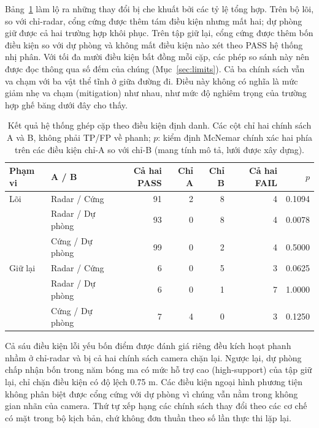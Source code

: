 \documentclass[conference]{IEEEtran}
\begin{document}
Bảng~\ref{tab:paired} làm lộ ra những thay đổi bị che khuất bởi các tỷ lệ tổng
hợp. Trên bộ lõi, so với chỉ-radar, cổng cứng được thêm tám điều kiện nhưng
mất hai; dự phòng giữ được cả hai trường hợp khôi phục. Trên tập giữ lại, cổng
cứng được thêm bốn điều kiện so với dự phòng và không mất điều kiện nào xét
theo PASS hệ thống nhị phân. Với tối đa mười điều kiện bất đồng mỗi cặp, các
phép so sánh này nên được đọc thông qua số đếm của chúng
(Mục~\ref{sec:limits}). Cả ba chính sách
vẫn va chạm với ba vật thể tĩnh ở giữa đường đi. Điều này không có nghĩa là
mức giảm nhẹ va chạm (mitigation) như nhau, như mức độ nghiêm trọng của trường
hợp ghế băng dưới đây cho thấy.

\begin{table}[t]
\caption{Kết quả hệ thống ghép cặp theo điều kiện định danh. Các cột chỉ hai
chính sách A và B, không phải TP/FP về phanh; $p$: kiểm định McNemar chính xác
hai phía trên các điều kiện chỉ-A so với chỉ-B (mang tính mô tả, lưới được xây
dựng).}
\label{tab:paired}
\centering\scriptsize
\setlength{\tabcolsep}{3pt}
\begin{tabular}{llrrrrr}
\toprule Phạm vi & A / B & Cả hai PASS & Chỉ A & Chỉ B & Cả hai FAIL & $p$\\ \midrule
Lõi & Radar / Cứng & 91 & 2 & 8 & 4 & 0.1094\\
 & Radar / Dự phòng & 93 & 0 & 8 & 4 & 0.0078\\
 & Cứng / Dự phòng & 99 & 0 & 2 & 4 & 0.5000\\
Giữ lại & Radar / Cứng & 6 & 0 & 5 & 3 & 0.0625\\
 & Radar / Dự phòng & 6 & 0 & 1 & 7 & 1.0000\\
 & Cứng / Dự phòng & 7 & 4 & 0 & 3 & 0.1250\\
\bottomrule
\end{tabular}
\end{table}

Cả sáu điều kiện lỗi yếu bốn điểm được đánh giá riêng đều kích hoạt phanh nhầm
ở chỉ-radar và bị cả hai chính sách camera chặn lại. Ngược lại, dự phòng chấp
nhận bốn trong năm bóng ma có mức hỗ trợ cao (high-support) của tập giữ lại,
chỉ chặn điều kiện có độ lệch 0.75 m. Các điều kiện ngoại hình phương tiện
không phân biệt được cổng cứng với dự phòng vì chúng vẫn nằm trong không gian
nhãn của camera. Thứ tự xếp hạng các chính sách thay đổi theo các cơ chế có
mặt trong bộ kịch bản, chứ không đơn thuần theo số lần thực thi lặp lại.
\end{document}
